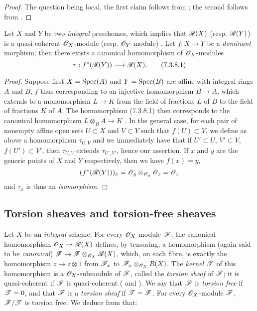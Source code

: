 \begin{proof}
\label{proof-1.7.3.7}
The question being local, the first claim follows from ; the second follows from .
\end{proof}

\begin{env}[7.3.8]
\label{1.7.3.8}
Let $X$ and $Y$ be two \emph{integral} preschemes, which implies that $\mathscr{R}(X)$ (resp. $\mathscr{R}(Y)$) is a quasi-coherent $\mathscr{O}_X$-module (resp. $\mathscr{O}_Y$-module) .
Let $f:X\to Y$ be a \emph{dominant} morphism; then there exists a canonical homomorphism of $\mathscr{O}_X$-modules
\[
  \tau:f^*(\mathscr{R}(Y))\longrightarrow\mathscr{R}(X).
  \tag{7.3.8.1}
\]
\end{env}

\begin{proof}
\label{proof-1.7.3.8}
Suppose first $X={\mathop{\mathrm{Spec}}\nolimits}(A)$ and $Y={\mathop{\mathrm{Spec}}\nolimits}(B)$ are affine with integral rings $A$ and $B$, $f$ thus corresponding to an injective homomorphism $B\to A$, which extends to a monomorphism $L\to K$ from the field of fractions $L$ of $B$ to the field of fractions $K$ of $A$.
The homomorphism (7.3.8.1) then corresponds to the canonical homomorphism $L\otimes_B A\to K$ .
In the general case, for each pair of nonempty affine open sets $U\subset X$ and $V\subset Y$ such that $f(U)\subset V$, we define as above a homomorphism $\tau_{U,V}$ and we immediately have that if $U'\subset U$, $V'\subset V$, $f(U')\subset V'$, then $\tau_{U,V}$ extends $\tau_{U',V'}$, hence our assertion.
If $x$ and $y$ are the generic points of $X$ and $Y$ respectively, then we have $f(x)=y$,
\[
  (f^*(\mathscr{R}(Y)))_x=\mathscr{O}_y\otimes_{\mathscr{O}_y}\mathscr{O}_x=\mathscr{O}_x
\]
 and $\tau_x$ is thus an \emph{isomorphism}.
\end{proof}

\subsection{Torsion sheaves and torsion-free sheaves}
\label{subsection-torsion-sheaves-and-torsion-free-sheaves}

\begin{env}[7.4.1]
\label{1.7.4.1}
Let $X$ be an \emph{integral} scheme.
For every $\mathscr{O}_X$-module $\mathscr{F}$, the canonical homomorphism $\mathscr{O}_X\to\mathscr{R}(X)$ defines, by tensoring, a homomorphism (again said to be \emph{canonical}) $\mathscr{F}\to\mathscr{F}\otimes_{\mathscr{O}_X}\mathscr{R}(X)$, which, on each fibre, is exactly the homomorphism $z\to z\otimes1$ from $\mathscr{F}_x$ to $\mathscr{F}_x\otimes_{\mathscr{O}_X}R(X)$.
The \emph{kernel $\mathscr{T}$} of this homomorphism is a $\mathscr{O}_X$-submodule of $\mathscr{F}$, called the \emph{torsion sheaf} of $\mathscr{F}$; it is quasi-coherent if $\mathscr{F}$ is quasi-coherent ( and ).
We say that $\mathscr{F}$ is \emph{torsion free} if $\mathscr{T}=0$, and that $\mathscr{F}$ is a \emph{torsion sheaf} if $\mathscr{T}=\mathscr{F}$.
For every $\mathscr{O}_X$-module $\mathscr{F}$, $\mathscr{F}/\mathscr{T}$ is torsion free.
We deduce from  that:
\end{env}

